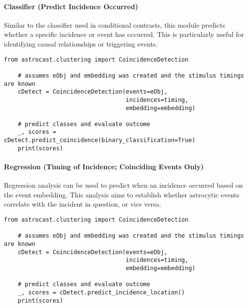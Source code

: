 \paragraph{Classifier (Predict Incidence Occurred)}
Similar to the classifier used in conditional contrasts, this module predicts whether a specific incidence or event has occurred. This is particularly useful for identifying causal relationships or triggering events.

\begin{lstlisting}[style=pyStyle]
    from astrocast.clustering import CoincidenceDetection

    # assumes eObj and embedding was created and the stimulus timings are known
    cDetect = CoincidenceDetection(events=eObj,
                                   incidences=timing,
                                   embedding=embedding)

    # predict classes and evaluate outcome
    _, scores = cDetect.predict_coincidence(binary_classification=True)
    print(scores)
\end{lstlisting}

\paragraph{Regression (Timing of Incidence; Coinciding Events Only)}
Regression analysis can be used to predict when an incidence occurred based on the event embedding. This analysis aims to establish whether astrocytic events correlate with the incident in question, or vice versa.

\begin{lstlisting}[style=pyStyle]
    from astrocast.clustering import CoincidenceDetection

    # assumes eObj and embedding was created and the stimulus timings are known
    cDetect = CoincidenceDetection(events=eObj,
                                   incidences=timing,
                                   embedding=embedding)

    # predict classes and evaluate outcome
    _, scores = cDetect.predict_incidence_location()
    print(scores)
\end{lstlisting}
